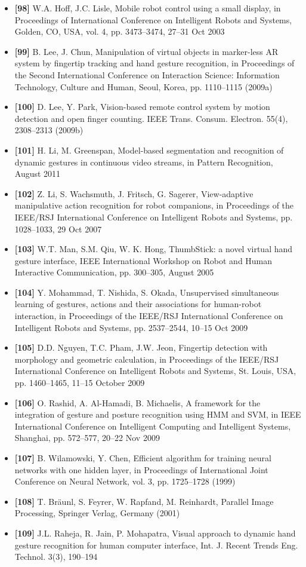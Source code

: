 \documentclass[12pt, a4paper]{article}
\begin{document}
\begin{itemize}[label=]
    \item \textbf{[98]} W.A. Hoff, J.C. Lisle, Mobile robot control using a small display, in Proceedings of International Conference on Intelligent Robots and Systems, Golden, CO, USA, vol. 4, pp. 3473–3474, 27–31 Oct 2003
    \item \textbf{[99]} B. Lee, J. Chun, Manipulation of virtual objects in marker-less AR system by fingertip tracking and hand gesture recognition, in Proceedings of the Second International Conference on Interaction Science: Information Technology, Culture and Human, Seoul, Korea, pp. 1110–1115 (2009a)
    \item \textbf{[100]} D. Lee, Y. Park, Vision-based remote control system by motion detection and open finger counting. IEEE Trans. Consum. Electron. 55(4), 2308–2313 (2009b)
    \item \textbf{[101]} H. Li, M. Greenspan, Model-based segmentation and recognition of dynamic gestures in continuous video streams, in Pattern Recognition, August 2011
    \item \textbf{[102]} Z. Li, S. Wachsmuth, J. Fritsch, G. Sagerer, View-adaptive manipulative action recognition for robot companions, in Proceedings of the IEEE/RSJ International Conference on Intelligent Robots and Systems, pp. 1028–1033, 29 Oct 2007
    \item \textbf{[103]} W.T. Man, S.M. Qiu, W. K. Hong, ThumbStick: a novel virtual hand gesture interface, IEEE International Workshop on Robot and Human Interactive Communication, pp. 300–305, August 2005
    \item \textbf{[104]} Y. Mohammad, T. Nishida, S. Okada, Unsupervised simultaneous learning of gestures, actions and their associations for human-robot interaction, in Proceedings of the IEEE/RSJ International Conference on Intelligent Robots and Systems, pp. 2537–2544, 10–15 Oct 2009
    \item \textbf{[105]} D.D. Nguyen, T.C. Pham, J.W. Jeon, Fingertip detection with morphology and geometric calculation, in Proceedings of the IEEE/RSJ International Conference on Intelligent Robots and Systems, St. Louis, USA, pp. 1460–1465, 11–15 October 2009
    \item \textbf{[106]} O. Rashid, A. Al-Hamadi, B. Michaelis, A framework for the integration of gesture and posture recognition using HMM and SVM, in IEEE International Conference on Intelligent Computing and Intelligent Systems, Shanghai, pp. 572–577, 20–22 Nov 2009
    \item \textbf{[107]} B. Wilamowski, Y. Chen, Efficient algorithm for training neural networks with one hidden layer, in Proceedings of International Joint Conference on Neural Network, vol. 3, pp. 1725–1728 (1999)
    \item \textbf{[108]} T. Bräunl, S. Feyrer, W. Rapfand, M. Reinhardt, Parallel Image Processing, Springer Verlag, Germany (2001)
    \item \textbf{[109]} J.L. Raheja, R. Jain, P. Mohapatra, Visual approach to dynamic hand gesture recognition for human computer interface, Int. J. Recent Trends Eng. Technol. 3(3), 190–194
\end{itemize}
\end{document}
